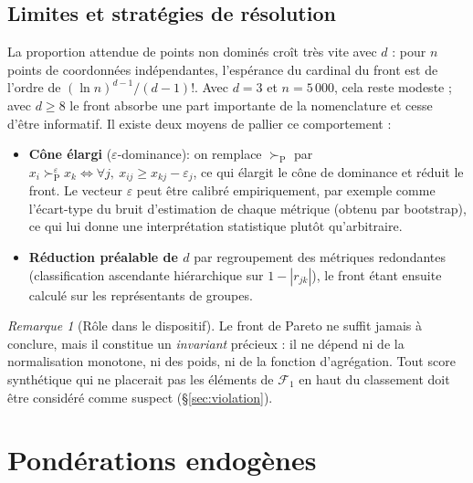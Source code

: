 \documentclass[11pt,a4paper]{article}
\theoremstyle{definition}
\theoremstyle{remark}
\newtheorem{remarque}{Remarque}[section]
\newcommand{\abs}[1]{\left\lvert #1 \right\rvert}
\newcommand{\pareto}{\succ_{\mathrm{P}}}
\begin{document}
\bigskip

\subsection{Limites et stratégies de résolution}

\medskip

La proportion attendue de points non dominés croît très vite avec $d$ : pour $n$ points de
coordonnées indépendantes, l'espérance du cardinal du front est de l'ordre de
$(\ln n)^{d-1}/(d-1)!$. Avec $d = 3$ et $n = 5\,000$, cela reste modeste ; avec $d \ge 8$ le front
absorbe une part importante de la nomenclature et cesse d'être informatif. Il existe deux moyens de pallier ce comportement :

\medskip

\begin{itemize}[nosep,leftmargin=1.4em]
  \item \textbf{Cône élargi} ($\varepsilon$-dominance): on remplace $\pareto$ par
  $x_i \pareto^{\varepsilon} x_k \iff \forall j,\ x_{ij} \ge x_{kj} - \varepsilon_j$, ce qui
  élargit le cône de dominance et réduit le front. Le vecteur $\varepsilon$ peut être calibré
  empiriquement, par exemple comme l'écart-type du bruit d'estimation de chaque métrique (obtenu
  par bootstrap), ce qui lui donne une interprétation statistique plutôt qu'arbitraire.
  \item \textbf{Réduction préalable de $d$} par regroupement des métriques redondantes (classification
  ascendante hiérarchique sur $1-\abs{r_{jk}}$), le front étant ensuite calculé sur les
  représentants de groupes.
\end{itemize}

\bigskip

\begin{remarque}[Rôle dans le dispositif]
  Le front de Pareto ne suffit jamais à conclure, mais il constitue un \emph{invariant} précieux :
  il ne dépend ni de la normalisation monotone, ni des poids, ni de la fonction d'agrégation.
  Tout score synthétique qui ne placerait pas les éléments de $\mathcal{F}_1$ en haut du classement
  doit être considéré comme suspect (§\ref{sec:violation}).
\end{remarque}

\bigskip

\section{Pondérations endogènes}
\label{sec:poids}
\end{document}
